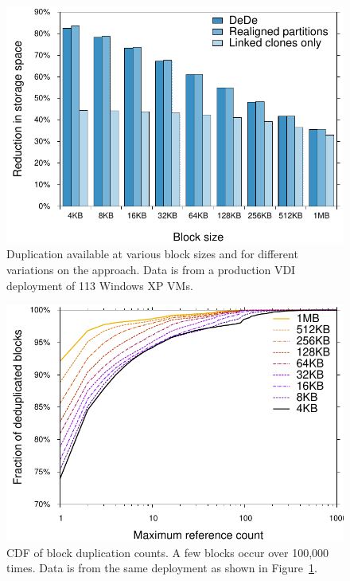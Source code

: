 \begin{figure}[t]
\centering
\includegraphics[scale=0.6]{figures/vmware-it-vdi-bar2.pdf}
\caption{Duplication available at various block sizes and for
  different variations on the approach. Data is from a
  production VDI deployment of 113 Windows XP VMs.}
\label{fig:vmware-it-vdi-bar}
\end{figure}



\begin{figure}[t]
\centering
\includegraphics[scale=0.6]{figures/vmware-it-vdi-cdf.pdf}
\caption{CDF of block duplication counts.  A few blocks occur over
  100,000 times. Data is from the same deployment as shown in
  Figure~\ref{fig:vmware-it-vdi-bar}.}
\vspace{-0.1in}
\label{fig:vmware-it-vdi-cdf}
\end{figure}

